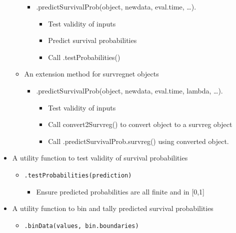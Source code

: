 \documentclass[
]{book}
\providecommand{\tightlist}{%
  \setlength{\itemsep}{0pt}\setlength{\parskip}{0pt}}
\begin{document}
\begin{itemize}
\begin{itemize}
    \begin{itemize}
    \tightlist
    \item
      .predictSurvivalProb(object, newdata, eval.time, \ldots).

      \begin{itemize}
      \tightlist
      \item
        Test validity of inputs
      \item
        Predict survival probabilities
      \item
        Call .testProbabilities()
      \end{itemize}
    \end{itemize}
  \item
    An extension method for survregnet objects

    \begin{itemize}
    \tightlist
    \item
      .predictSurvivalProb(object, newdata, eval.time, lambda, \ldots).

      \begin{itemize}
      \tightlist
      \item
        Test validity of inputs
      \item
        Call convert2Survreg() to convert object to a survreg object
      \item
        Call .predictSurvivalProb.survreg() using converted object.
      \end{itemize}
    \end{itemize}
  \end{itemize}
\item
  A utility function to test validity of survival probabilities

  \begin{itemize}
  \tightlist
  \item
    \texttt{.testProbabilities(prediction)}

    \begin{itemize}
    \tightlist
    \item
      Ensure predicted probabilities are all finite and in {[}0,1{]}
    \end{itemize}
  \end{itemize}
\item
  A utility function to bin and tally predicted survival probabilities

  \begin{itemize}
  \tightlist
  \item
    \texttt{.binData(values,\ bin.boundaries)}


\end{itemize}
\end{itemize}
\end{document}
